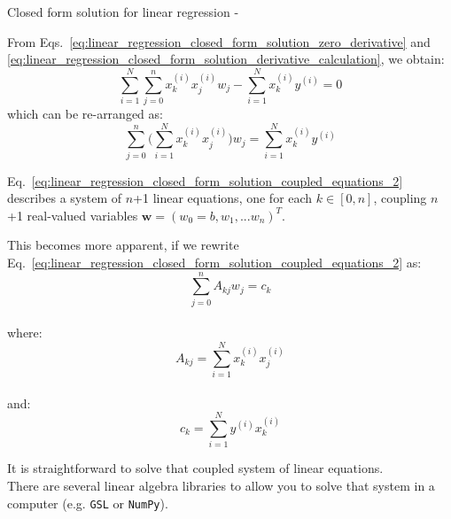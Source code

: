 \begin{frame}[t,allowframebreaks]{Closed form solution for linear regression -}
    \framebreak

    From Eqs.~\ref{eq:linear_regression_closed_form_solution_zero_derivative} and
    \ref{eq:linear_regression_closed_form_solution_derivative_calculation}, 
    we obtain:
    \begin{equation}
        \sum_{i=1}^{N} \sum_{j=0}^{n} x_k^{(i)} x_j^{(i)} w_j -
        \sum_{i=1}^{N} x_k^{(i)} y^{(i)} = 0
        \label{eq:linear_regression_closed_form_solution_coupled_equations_1}
    \end{equation}
    which can be re-arranged as:
    \begin{equation}
        \sum_{j=0}^{n} \Big(\sum_{i=1}^{N} x_k^{(i)} x_j^{(i)} \Big) w_j = 
        \sum_{i=1}^{N} x_k^{(i)} y^{(i)}  
        \label{eq:linear_regression_closed_form_solution_coupled_equations_2}
    \end{equation}

    Eq.~\ref{eq:linear_regression_closed_form_solution_coupled_equations_2} 
    describes a system of $n$+1 linear equations, one for each $k \in [0,n]$,
    coupling $n$+1 real-valued variables $\mathbf{w}=(w_0=b, w_1,...w_{n})^T$.

    \framebreak

    This becomes more apparent, if we rewrite 
    Eq.~\ref{eq:linear_regression_closed_form_solution_coupled_equations_2} as:
    \begin{equation}
        \sum_{j=0}^{n} A_{kj} w_j = c_k
        \label{eq:linear_regression_closed_form_solution_coupled_equations_3}
    \end{equation}\\
    \vspace{-0.1cm}
    where:\\
    \vspace{-0.5cm}
    \begin{equation}
        A_{kj} = \sum_{i=1}^{N}  x_k^{(i)} x_j^{(i)}
        \label{eq:linear_regression_closed_form_solution_coupled_equations_A}
    \end{equation}\\
    \vspace{-0.3cm}
    and:\\
    \vspace{-0.3cm}
    \begin{equation}
        c_{k} = \sum_{i=1}^{N} y^{(i)} x_k^{(i)}
        \label{eq:linear_regression_closed_form_solution_coupled_equations_c}
    \end{equation}

    It is straightforward to solve that coupled system of linear equations.\\
    \vspace{0.3cm}
    There are several linear algebra libraries to allow you to solve that 
    system in a computer (e.g. {\tt GSL} or {\tt NumPy}).\\


\end{frame}
